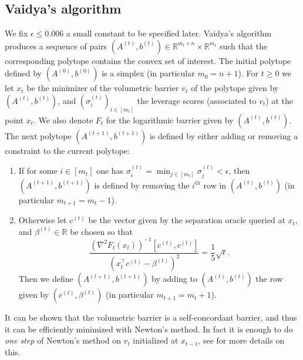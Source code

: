 \subsection{Vaidya's algorithm}
We fix $\epsilon \leq 0.006$ a small constant to be specified later. Vaidya's algorithm produces a sequence of pairs $(A^{(t)}, b^{(t)}) \in \mathbb{R}^{m_t \times n} \times \mathbb{R}^{m_t}$ such that the corresponding polytope contains the convex set of interest. The initial polytope defined by $(A^{(0)},b^{(0)})$ is a simplex (in particular $m_0=n+1$). For $t\geq0$ we let $x_t$ be the minimizer of the volumetric barrier $v_t$ of the polytope given by $(A^{(t)}, b^{(t)})$, and $(\sigma_i^{(t)})_{i \in [m_t]}$ the leverage scores (associated to $v_t$) at the point $x_t$. We also denote $F_t$ for the logarithmic barrier given by $(A^{(t)}, b^{(t)})$. The next polytope $(A^{(t+1)}, b^{(t+1)})$ is defined by either adding or removing a constraint to the current polytope:
\begin{enumerate}
\item If for some $i \in [m_t]$ one has $\sigma_i^{(t)} = \min_{j \in [m_t]} \sigma_j^{(t)} < \epsilon$, then $(A^{(t+1)}, b^{(t+1)})$ is defined by removing the $i^{th}$ row in $(A^{(t)}, b^{(t)})$ (in particular $m_{t+1} = m_t - 1$).
\item Otherwise let $c^{(t)}$ be the vector given by the separation oracle queried at $x_t$, and $\beta^{(t)} \in \mathbb{R}$ be chosen so that 
$$\frac{(\nabla^2 F_t(x_t) )^{-1}[c^{(t)}, c^{(t)}]}{(x_t^{\top} c^{(t)} - \beta^{(t)})^2} = \frac{1}{5} \sqrt{\epsilon} .$$
Then we define $(A^{(t+1)}, b^{(t+1)})$ by adding to $(A^{(t)}, b^{(t)})$ the row given by $(c^{(t)}, \beta^{(t)})$ (in particular $m_{t+1} = m_t + 1$).
\end{enumerate}
It can be shown that the volumetric barrier is a self-concordant barrier, and thus it can be efficiently minimized with Newton's method. In fact it is enough to do {\em one step} of Newton's method on $v_t$ initialized at $x_{t-1}$, see \cite{Vai89, Vai96} for more details on this.

